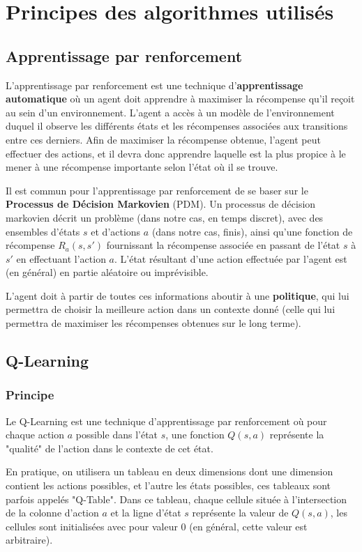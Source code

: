 \chapter{Principes des algorithmes utilisés}
\section{Apprentissage par renforcement}
L'apprentissage par renforcement est une technique d'\textbf{apprentissage automatique} où un agent doit apprendre à maximiser la récompense qu'il reçoit au sein d'un environnement. L'agent a accès à un modèle de l'environnement duquel il observe les différents états et les récompenses associées aux transitions entre ces derniers. Afin de maximiser la récompense obtenue, l'agent peut effectuer des actions, et il devra donc apprendre laquelle est la plus propice à le mener à une récompense importante selon l'état où il se trouve.
\par
Il est commun pour l'apprentissage par renforcement de se baser sur le \textbf{Processus de Décision Markovien} (PDM). Un processus de décision markovien décrit un problème (dans notre cas, en temps discret), avec des ensembles d'états $s$ et d'actions $a$ (dans notre cas, finis), ainsi qu'une fonction de récompense $R_a(s,s')$ fournissant la récompense associée en passant de l'état $s$ à $s'$ en effectuant l'action $a$. L'état résultant d'une action effectuée par l'agent est (en général) en partie aléatoire ou imprévisible.
\par
L'agent doit à partir de toutes ces informations aboutir à une \textbf{politique}, qui lui permettra de choisir la meilleure action dans un contexte donné (celle qui lui permettra de maximiser les récompenses obtenues sur le long terme).
\par

\section{Q-Learning}
\subsection{Principe}
Le Q-Learning est une technique d'apprentissage par renforcement où pour chaque action $a$ possible dans l'état $s$, une fonction $Q(s,a)$ représente la "qualité" de l'action dans le contexte de cet état.
\par
En pratique, on utilisera un tableau en deux dimensions dont une dimension contient les actions possibles, et l'autre les états possibles, ces tableaux sont parfois appelés "Q-Table". Dans ce tableau, chaque cellule située à l'intersection de la colonne d'action $a$ et la ligne d'état $s$ représente la valeur de $Q(s,a)$, les cellules sont initialisées avec pour valeur 0 (en général, cette valeur est arbitraire).

